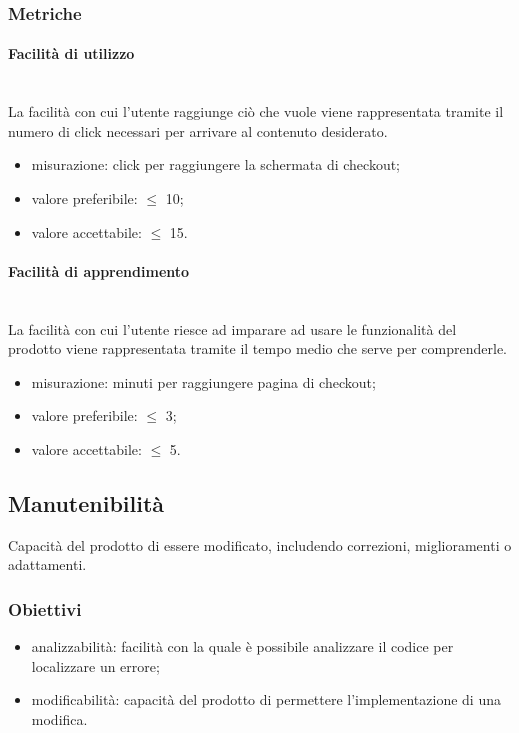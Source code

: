 		\subsubsection{Metriche}
			\paragraph{Facilità di utilizzo}\mbox{}\\
			La facilità con cui l'utente raggiunge ciò che vuole viene rappresentata tramite il numero di click necessari per arrivare al contenuto desiderato.
			\begin{itemize}
			\item misurazione: click per raggiungere la schermata di checkout;
			\item valore preferibile: $\leq$ 10;
			\item valore accettabile: $\leq$ 15.
			\end{itemize}
			\paragraph{Facilità di apprendimento}\mbox{}\\
			La facilità con cui l'utente riesce ad imparare ad usare le funzionalità del prodotto viene rappresentata tramite il tempo medio che serve per comprenderle.
			\begin{itemize}
			\item misurazione: minuti per raggiungere pagina di checkout;
			\item valore preferibile: $\leq$ 3;
			\item valore accettabile: $\leq$ 5.
			\end{itemize}
\pagebreak
	\subsection{Manutenibilità}
	Capacità del prodotto di essere modificato, includendo correzioni, miglioramenti o adattamenti.
		\subsubsection{Obiettivi}
		\begin{itemize}
			\item analizzabilità: facilità con la quale è possibile analizzare il codice per localizzare un errore;
			\item modificabilità: capacità del prodotto di permettere l'implementazione di una modifica.
		\end{itemize}
